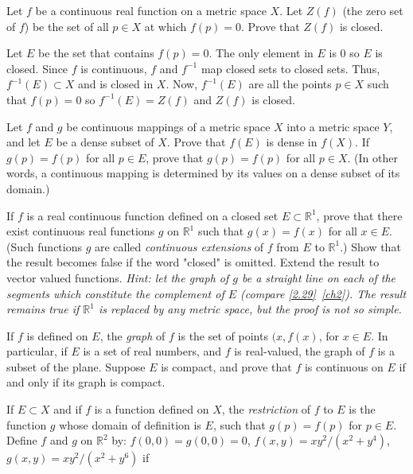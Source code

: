 \begin{exercise}
\item
  Let \(f\) be a continuous real function on a metric space \(X\).
  Let \(Z(f)\) (the zero set of \(f\)) be the set of all \(p\in X\) at which
  \(f(p) = 0\).
  Prove that \(Z(f)\) is closed.
  \par\smallskip
  Let \(E\) be the set that contains \(f(p) = 0\).
  The only element in \(E\) is \(0\) so \(E\) is closed.
  Since \(f\) is continuous, \(f\) and \(f^{-1}\) map closed sets to closed
  sets.
  Thus, \(f^{-1}(E)\subset X\) and is closed in \(X\).
  Now, \(f^{-1}(E)\) are all the points \(p\in X\) such that \(f(p) = 0\) so
  \(f^{-1}(E) = Z(f)\) and \(Z(f)\) is closed.
\item
  Let \(f\) and \(g\) be continuous mappings of a metric space \(X\) into a
  metric space \(Y\), and let \(E\) be a dense subset of \(X\).
  Prove that \(f(E)\) is dense in \(f(X)\).
  If \(g(p) = f(p)\) for all \(p\in E\), prove that \(g(p) = f(p)\) for all
  \(p\in X\).
  (In other words, a continuous mapping is determined by its values on a dense
  subset of its domain.)
\item
  If \(f\) is a real continuous function defined on a closed set
  \(E\subset\mathbb{R}^1\), prove that there exist continuous real functions
  \(g\) on \(\mathbb{R}^1\) such that \(g(x) = f(x)\) for all \(x\in E\).
  (Such functions \(g\) are called \textit{continuous extensions} of \(f\) from
  \(E\) to \(\mathbb{R}^1\).)
  Show that the result becomes false if the word "closed" is omitted.
  Extend the result to vector valued functions.
  \textit{Hint: let the graph of \(g\) be a straight line on each of the
    segments which constitute the complement of \(E\) (compare
    \cref{2.29}~\cref{ch2}).
    The result remains true if \(\mathbb{R}^1\) is replaced by any metric
    space, but the proof is not so simple.}
\item
  If \(f\) is defined on \(E\), the \textit{graph} of \(f\) is the set of
  points \((x,f(x)\), for \(x\in E\).
  In particular, if \(E\) is a set of real numbers, and \(f\) is real-valued,
  the graph of \(f\) is a subset of the plane.
  Suppose \(E\) is compact, and prove that \(f\) is continuous on \(E\) if and
  only if its graph is compact.
\item
  If \(E\subset X\) and if \(f\) is a function defined on \(X\), the
  \textit{restriction} of \(f\) to \(E\) is the function \(g\) whose domain of
  definition is \(E\), such that \(g(p) = f(p)\) for \(p\in E\).
  Define \(f\) and \(g\) on \(\mathbb{R}^2\) by: \(f(0,0) = g(0,0) = 0\),
  \(f(x,y) = xy^2/(x^2 + y^4)\), \(g(x,y) = xy^2/(x^2 + y^6)\) if

\end{exercise}
